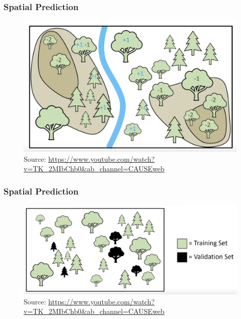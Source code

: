 \documentclass[
  shownotes,
  xcolor={svgnames},
  hyperref={colorlinks,citecolor=DarkBlue,linkcolor=andesred,urlcolor=DarkBlue}
  , aspectratio=169]{beamer}
\begin{document}
\begin{frame}[fragile]
\frametitle{Spatial Prediction}

\begin{figure}[H] \centering
            \captionsetup{justification=centering}
\includegraphics[scale=0.4]{figures/spatial_cross/fig06.png}
\\
\tiny
Source: \url{https://www.youtube.com/watch?v=TK_2MIbChb0&ab_channel=CAUSEweb}
 \end{figure}
\end{frame}

\begin{frame}[fragile]
\frametitle{Spatial Prediction}

\begin{figure}[H] \centering
            \captionsetup{justification=centering}
\includegraphics[scale=0.3]{figures/spatial_cross/fig07.png}
\\
\tiny
Source: \url{https://www.youtube.com/watch?v=TK_2MIbChb0&ab_channel=CAUSEweb}
 \end{figure}
\end{frame}
\end{document}
